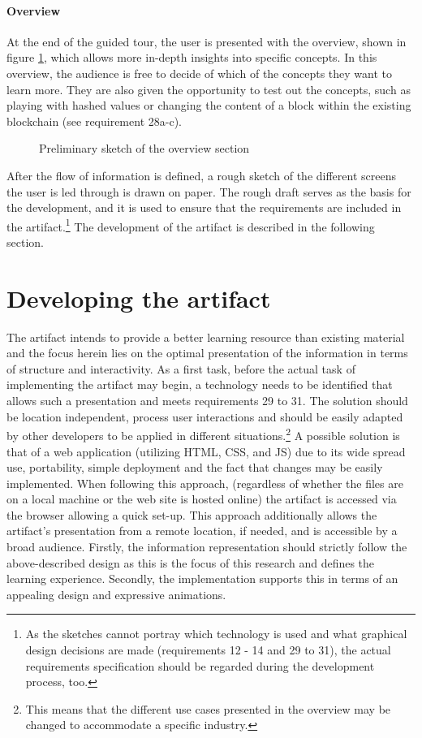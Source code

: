 \paragraph{Overview} At the end of the guided tour, the user is presented with the overview, shown in figure \ref{fig:OverviewPic}, which allows more in-depth insights into specific concepts.
In this overview, the audience is free to decide of which of the concepts they want to learn more. They are also given the opportunity to test out the concepts, such as playing with hashed values or changing the content of a block within the existing blockchain (see requirement 28a-c).

\begin{figure}
    \centering
    
    \caption{Preliminary sketch of the overview section}
    \label{fig:OverviewPic}
\end{figure}

After the flow of information is defined, a rough sketch of the different screens the user is led through is drawn on paper. The rough draft serves as the basis for the development, and it is used to ensure that the requirements are included in the artifact.\footnote{As the sketches cannot portray which technology is used and what graphical design decisions are made (requirements 12 - 14 and 29 to 31), the actual requirements specification should be regarded during the development process, too.} The development of the artifact is described in the following section.

\section{Developing the artifact} \label{sec:DevArtifact}

The artifact intends to provide a better learning resource than existing material and the focus herein lies on the optimal presentation of the information in terms of structure and interactivity. As a first task, before the actual task of implementing the artifact may begin, a technology needs to be identified that allows such a presentation and meets requirements 29 to 31. The solution should be location independent, process user interactions and should be easily adapted by other developers to be applied in different situations.\footnote{This means that the different use cases presented in the overview may be changed to accommodate a specific industry.} A possible solution is that of a web application (utilizing \ac{HTML}, \ac{CSS}, and \ac{JS}) due to its wide spread use, portability, simple deployment and the fact that changes may be easily implemented. When following this approach, (regardless of whether the files are on a local machine or the web site is hosted online) the artifact is accessed via the browser allowing a quick set-up. This approach additionally allows the artifact's presentation from a remote location, if needed, and is accessible by a broad audience. Firstly, the information representation should strictly follow the above-described design as this is the focus of this research and defines the learning experience. Secondly, the implementation supports this in terms of an appealing design and expressive animations.


